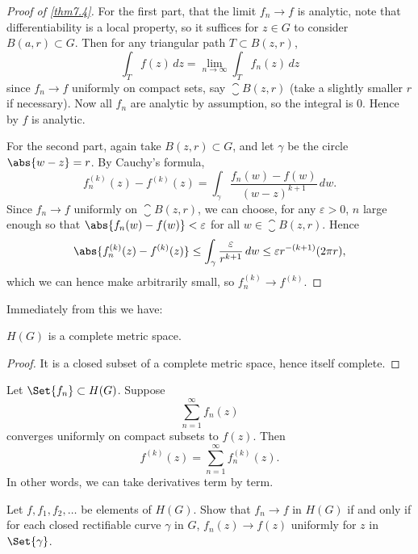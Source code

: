 


\begin{proof}[Proof of \autoref{thm7.4}]
	For the first part, that the limit $f_n \to f$ is analytic, note that differentiability is a local property, so it suffices for $z \in G$ to consider $B(a, r) \subset G$.
	Then for any triangular path $T \subset B(z, r)$,
	\[
		\int_T f(z) \, d z = \lim_{n \to \infty} \int_T f_n(z) \, d z
	\]
	since $f_n \to f$ uniformly on compact sets, say $\closure{B(z, r)}$ (take a slightly smaller $r$ if necessary).
	Now all $f_n$ are analytic by assumption, so the integral is $0$.
	Hence by  $f$ is analytic.

	For the second part, again take $B(z, r) \subset G$, and let $\gamma$ be the circle $\abs{w - z} = r$.
	By Cauchy's formula,
	\[
		f_n^{(k)}(z) - f^{(k)}(z) = \int_\gamma \frac{f_n(w) - f(w)}{(w - z)^{k + 1}} \, d w.
	\]
	Since $f_n \to f$ uniformly on $\closure{B(z, r)}$, we can choose, for any $\varepsilon > 0$, $n$ large enough so that $\abs{f_n(w) - f(w)} < \varepsilon$ for all $w \in \closure{B(z, r)}$.
	Hence
	\[
		\abs{f_n^{(k)}(z) - f^{(k)}(z)} \leq \int_\gamma \frac{\varepsilon}{r^{k + 1}} \, d w \leq \varepsilon r^{-(k + 1)} (2 \pi r),
	\]
	which we can hence make arbitrarily small, so $f_n^{(k)} \to f^{(k)}$.
\end{proof}

Immediately from this we have:

\begin{corollary}\label{cor7.5}
	$H(G)$ is a complete metric space.
\end{corollary}

\begin{proof}
	It is a closed subset of a complete metric space, hence itself complete.
\end{proof}

\begin{corollary}\label{cor7.6}
	Let $\Set{f_n} \subset H(G)$.
	Suppose
	\[
		\sum_{n = 1}^\infty f_n(z)
	\]
	converges uniformly on compact subsets to $f(z)$.
	Then
	\[
		f^{(k)}(z) = \sum_{n = 1}^\infty f_n^{(k)}(z).
	\]
	In other words, we can take derivatives term by term.
\end{corollary}

\begin{exercise}
	Let $f, f_1, f_2, \dots$ be elements of $H(G)$.
	Show that $f_n \to f$ in $H(G)$ if and only if for each closed rectifiable curve $\gamma$ in $G$, $f_n(z) \to f(z)$ uniformly for $z$ in $\Set{\gamma}$.
\end{exercise}

